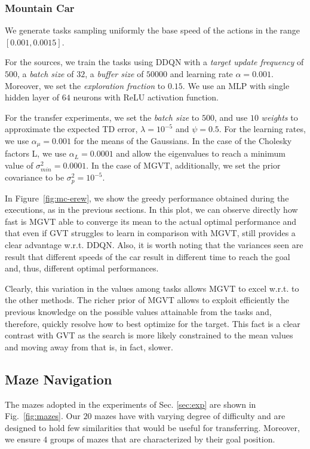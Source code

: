 \documentclass{article}
\begin{document}
\subsubsection{Mountain Car}

We generate tasks sampling uniformly the base speed of the actions in the range $\left[0.001, 0.0015\right]$. 

For the sources, we train the tasks using DDQN with a \textit{target update frequency} of $500$, a \textit{batch size} of $32$, a  \textit{buffer size} of $50000$ and learning rate $\alpha=0.001$. Moreover, we set the \textit{exploration fraction} to $0.15$. We use an MLP with single hidden layer of $64$ neurons with ReLU activation function. 

For the transfer experiments, we set the \textit{batch size} to $500$, and use $10$ \textit{weights} to approximate the expected TD error, $\lambda=10^{-5}$ and $\psi=0.5$. For the learning rates, we use $\alpha_{\mu}=0.001$ for the means of the Gaussians. In the case of the Cholesky factors L, we use $\alpha_L=0.0001$ and allow the eigenvalues to reach a minimum value of $\sigma_{min}^2=0.0001$. In the case of MGVT, additionally, we set the prior covariance to be $\sigma_p^2=10^{-5}$.

In Figure~\ref{fig:mc-erew}, we show the greedy performance obtained during the executions, as in the previous sections. In this plot, we can observe directly how fast is MGVT able to converge its mean to the actual optimal performance and that even if GVT struggles to learn in comparison with MGVT, still provides a clear advantage w.r.t. DDQN. Also, it is worth noting that the variances seen are result that different speeds of the car result in different time to reach the goal and, thus, different optimal performances.

Clearly, this variation in the values among tasks allows MGVT to excel w.r.t. to the other methods. The richer prior of MGVT allows to exploit efficiently the previous knowledge on the possible values attainable from the tasks and, therefore, quickly resolve how to best optimize for the target. This fact is a clear contrast with GVT as the search is more likely constrained to the mean values and moving away from that is, in fact, slower.

\subsection{Maze Navigation}\label{app:c3}

The mazes adopted in the experiments of Sec. \ref{sec:exp} are shown in Fig.~\ref{fig:mazes}. Our $20$ mazes have with varying degree of difficulty and are designed to hold few similarities that would be useful for transferring. Moreover, we ensure $4$ groups of mazes that are characterized by their goal position. 
\end{document}
